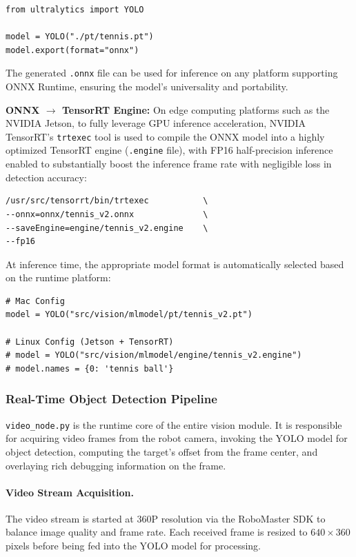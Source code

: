 \begin{verbatim}
from ultralytics import YOLO

model = YOLO("./pt/tennis.pt")
model.export(format="onnx")
\end{verbatim}

The generated \texttt{.onnx} file can be used for inference on any platform supporting ONNX Runtime, ensuring the model's universality and portability.

\textbf{ONNX $\rightarrow$ TensorRT Engine:} On edge computing platforms such as the NVIDIA Jetson, to fully leverage GPU inference acceleration, NVIDIA TensorRT's \texttt{trtexec} tool is used to compile the ONNX model into a highly optimized TensorRT engine (\texttt{.engine} file), with FP16 half-precision inference enabled to substantially boost the inference frame rate with negligible loss in detection accuracy:

\begin{verbatim}
/usr/src/tensorrt/bin/trtexec           \
--onnx=onnx/tennis_v2.onnx              \
--saveEngine=engine/tennis_v2.engine    \
--fp16
\end{verbatim}

At inference time, the appropriate model format is automatically selected based on the runtime platform:

\begin{verbatim}
# Mac Config
model = YOLO("src/vision/mlmodel/pt/tennis_v2.pt")

# Linux Config (Jetson + TensorRT)
# model = YOLO("src/vision/mlmodel/engine/tennis_v2.engine")
# model.names = {0: 'tennis ball'}
\end{verbatim}

\subsubsection{Real-Time Object Detection Pipeline}
\label{sec:cv:pipeline}

\texttt{video\_node.py} is the runtime core of the entire vision module. It is responsible for acquiring video frames from the robot camera, invoking the YOLO model for object detection, computing the target's offset from the frame center, and overlaying rich debugging information on the frame.

\paragraph{Video Stream Acquisition.} The video stream is started at 360P resolution via the RoboMaster SDK to balance image quality and frame rate. Each received frame is resized to $640\times360$ pixels before being fed into the YOLO model for processing.

